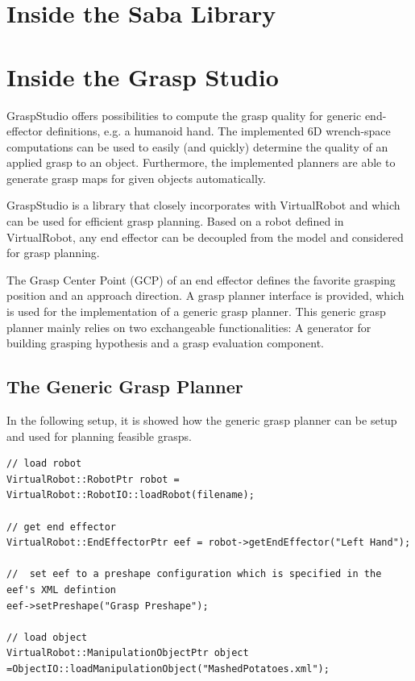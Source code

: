 \chapter{Inside the Saba Library}
\chapter{Inside the Grasp Studio}
GraspStudio offers possibilities to compute the grasp quality for generic end-effector definitions, e.g. a humanoid hand. The implemented 6D wrench-space computations can be used to easily (and quickly) determine the quality of an applied grasp to an object. Furthermore, the implemented planners are able to generate grasp maps for given objects automatically. \par GraspStudio is a library that closely incorporates with VirtualRobot and which can be used for efficient grasp planning. Based on a robot defined in VirtualRobot, any end effector can be decoupled from the model and considered for grasp planning. \par The Grasp Center Point (GCP) of an end effector defines the favorite grasping position and an approach direction. A grasp planner interface is provided, which is used for the implementation of a generic grasp planner. This generic grasp planner mainly relies on two exchangeable functionalities: A generator for building grasping hypothesis and a grasp evaluation component.

\section{The Generic Grasp Planner}
In the following setup, it is showed how the generic grasp planner can be setup and used for planning feasible grasps. 
\begin{lstlisting}
// load robot
VirtualRobot::RobotPtr robot = VirtualRobot::RobotIO::loadRobot(filename);

// get end effector
VirtualRobot::EndEffectorPtr eef = robot->getEndEffector("Left Hand");

//  set eef to a preshape configuration which is specified in the eef's XML defintion 
eef->setPreshape("Grasp Preshape");

// load object
VirtualRobot::ManipulationObjectPtr object =ObjectIO::loadManipulationObject("MashedPotatoes.xml");
\end{lstlisting}
